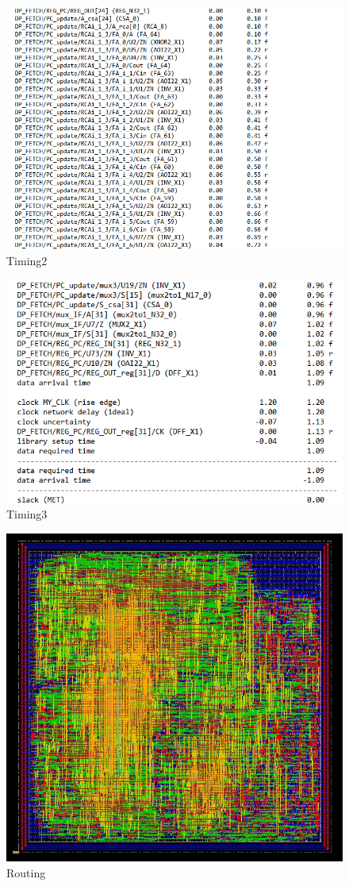 \begin{figure}[h!]
	\centering
	\includegraphics[width=20cm]{./images/RISC_tim2}
	\caption{Timing2}
	\label{fig5.4}
\end{figure}
\begin{figure}[h!]
	\centering
	\includegraphics[width=18cm]{./images/RISC_tim3}
	\caption{Timing3}
	\label{fig5.5}
\end{figure}
\begin{figure}[h!]
	\centering
	\includegraphics[width=18cm]{./images/original_route}
	\caption{Routing}
	\label{fig5.6}
\end{figure}